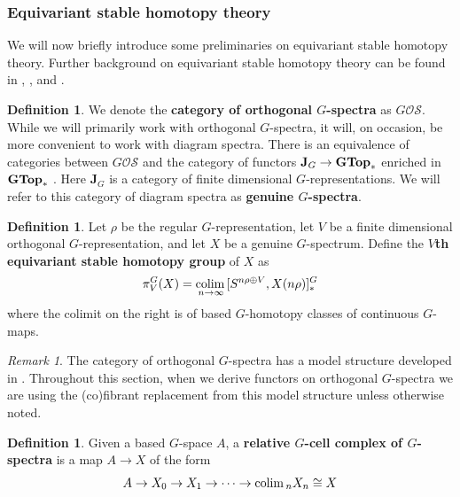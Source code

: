 \documentclass[11pt]{amsart}
\newcommand{\beforesubsection}{\vspace{1em}}
\newcommand{\aftersubsection}{}
\newcommand{\cat}[1]{\textup{\textbf{{#1}}}}
\newcommand{\GTop}{\cat{GTop}}
\newcommand{\colim}{\textup{colim}\,}
\newcommand{\Osp}{\mathcal{OS}}
\theoremstyle{plain}   %
\theoremstyle{definition}
\newtheorem{df}[thm]{Definition}
\theoremstyle{remark}
\newtheorem{rmk}[thm]{Remark}
\numberwithin{equation}{section}
\begin{document}
\beforesubsection
\subsubsection{Equivariant stable homotopy theory}\aftersubsection 


We will now briefly introduce some preliminaries on equivariant stable homotopy theory. Further background on equivariant stable homotopy theory can be found in \cite{mandell2002equivariant}, \cite{schwede_global}, and \cite{hhr_book}.


\begin{df}
We denote the \textbf{category of orthogonal $G$-spectra} as $G\Osp$. While we will primarily work with orthogonal $G$-spectra, it will, on occasion, be more convenient to work with diagram spectra. There is an equivalence of categories between $G\Osp$ and the category of functors $\textbf{J}_G\to \GTop_*$ enriched in $\GTop_*$ \cite{mandell2002equivariant}. Here $\textbf{J}_G$ is a category of finite dimensional $G$-representations. We will refer to this category of diagram spectra as \textbf{genuine $G$-spectra}.
\end{df}

\begin{df}
Let $\rho$ be the regular $G$-representation, let $V$ be a finite dimensional orthogonal $G$-representation, and let $X$ be a genuine $G$-spectrum. Define the \textbf{$V$th equivariant stable homotopy group} of $X$ as 
\[
\pi_V^G(X) = \underset{n\to\infty}{\colim}[S^{n\rho\oplus V},X(n\rho)]_*^G
\]
where the colimit on the right is of based $G$-homotopy classes of continuous $G$-maps.
\end{df}

\begin{rmk}
The category of orthogonal $G$-spectra has a model structure developed in \cite[III.4.2]{mandell2002equivariant}. Throughout this section, when we derive functors on orthogonal $G$-spectra we are using the (co)fibrant replacement from this model structure unless otherwise noted. 
\end{rmk}



\iffalse
\begin{df}
Given a based $G$-space $A$, a \textbf{relative $G$-cell complex of $G$-spectra} is a map $A\to X$ of the form 
\[
A\to X_0\to X_1\to \dots \to \colim_nX_n\cong X
\] 
\begin{figure}[H]
\center
{}
\end{figure}
\end{df}
\end{document}
